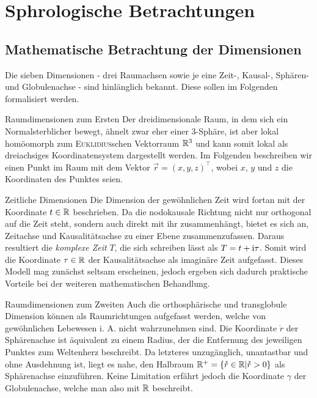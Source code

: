 \chapter[tocentry=Sphärologische Betrachtungen, head=Sphärologische Betrachtungen]{Sph\aech rologische Betrachtungen}
\section{Mathematische Betrachtung der Dimensionen}
Die sieben Dimensionen - drei Raumachsen sowie je eine Zeit-, Kausal-, Sphären- und Globulenachse - sind hinlänglich bekannt. Diese sollen im Folgenden formalisiert werden.
\begin{bla}{Raumdimensionen zum Ersten}
Der dreidimensionale Raum, in dem sich ein Normalsterblicher bewegt, ähnelt zwar eher einer 3-Sphäre, ist aber lokal homöomorph zum \textsc{Euklidius}schen Vektorraum $\mathbb{R}^3$ und kann somit lokal als dreiachsiges Koordinatensystem dargestellt werden. Im Folgenden beschreiben wir einen Punkt im Raum mit dem Vektor $\vec{r}=(x,y,z)^\top$, wobei $x$, $y$ und $z$ die Koordinaten des Punktes seien.
\end{bla}
\begin{bla}{Zeitliche Dimensionen}
Die Dimension der gewöhnlichen Zeit wird fortan mit der Koordinate $t\in\mathbb{R}$ beschrieben. Da die nodokausale Richtung nicht nur orthogonal auf die Zeit steht, sondern auch direkt mit ihr zusammenhängt, bietet es sich an, Zeitachse und Kausalitätsachse zu einer Ebene zusammenzufassen. Daraus resultiert die \emph{komplexe Zeit} $T$, die sich schreiben lässt als $T=t+\text{\rmfamily i}\tau$. Somit wird die Koordinate $\tau\in\mathbb{R}$ der Kausalitätsachse als imaginäre Zeit aufgefasst. Dieses Modell mag zunächst seltsam erscheinen, jedoch ergeben sich dadurch praktische Vorteile bei der weiteren mathematischen Behandlung.
\end{bla}
\begin{bla}{Raumdimensionen zum Zweiten}
Auch die orthosphärische und transglobule Dimension können als Raumrichtungen aufgefasst werden, welche von gewöhnlichen Lebewesen i. A. nicht wahrzunehmen sind. Die Koordinate $\mathring{r}$ der Sphärenachse ist äquivalent zu einem Radius, der die Entfernung des jeweiligen Punktes zum Weltenherz beschreibt. Da letzteres unzugänglich, unantastbar und ohne Ausdehnung ist, liegt es nahe, den Halbraum $\mathbb{R}^+=\{\mathring{r}\in\mathbb{R}|\mathring{r}>0\}$ als Sphärenachse einzuführen. Keine Limitation erfährt jedoch die Koordinate $\gamma$ der Globulenachse, welche man also mit $\mathbb{R}$ beschreibt.
\end{bla}
